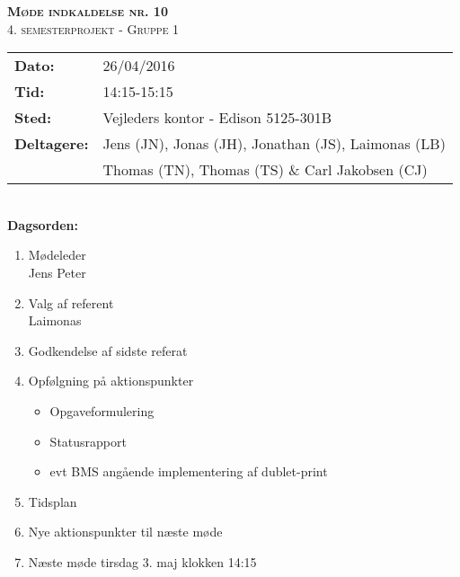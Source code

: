
\newcommand{\HRule}{\rule{\linewidth}{0.1mm}}


	\begin{center}
		{\huge \bfseries \textsc{Møde indkaldelse nr. 10}}\\
		\textsc{\large 4. semesterprojekt - Gruppe 1}\\[0.3cm]
	\end{center}
	\begin{tabular}{ll}
	\large \textbf{Dato:} & 26/04/2016  \\ %
	\large \textbf{Tid:}  & 14:15-15:15 \\ %
	\large \textbf{Sted:} & Vejleders kontor - Edison 5125-301B		\\ %
	\large \textbf{Deltagere:} & Jens (JN), Jonas (JH), Jonathan (JS), Laimonas (LB) \\
	\large \textbf & Thomas (TN),  Thomas (TS) \& Carl Jakobsen (CJ)\\
	\end{tabular}\\
	\phantom{\,}\hspace{0.1em} \large \textbf{Dagsorden:}
	\begin{enumerate}
		\itemsep 0.3em 
		\item Mødeleder\\
			Jens Peter\\
		\item Valg af referent\\
			Laimonas\\
		\item Godkendelse af sidste referat\\

		\item Opfølgning på aktionspunkter
		\begin{itemize}
			\itemsep 0.3em
			\item Opgaveformulering
			\item Statusrapport
			\item evt BMS angående implementering af dublet-print\\
		\end{itemize}
		\item Tidsplan\\
		\item Nye aktionspunkter til næste møde\\
		\item Næste møde tirsdag 3. maj klokken 14:15
	\end{enumerate}
